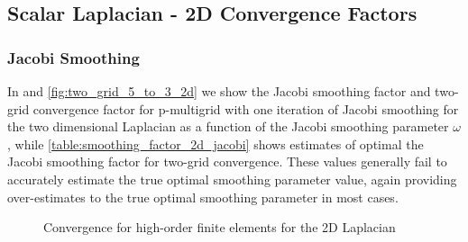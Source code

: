 \documentclass[review]{siamart190516}
\begin{document}
\subsection{Scalar Laplacian - 2D Convergence Factors}\label{sec:2dresults}

\subsubsection{Jacobi Smoothing}

In  and \cref{fig:two_grid_5_to_3_2d} we show the Jacobi smoothing factor and two-grid convergence factor for p-multigrid with one iteration of Jacobi smoothing for the two dimensional Laplacian as a function of the Jacobi smoothing parameter $\omega$, while \cref{table:smoothing_factor_2d_jacobi} shows estimates of optimal the Jacobi smoothing factor for two-grid convergence.
These values generally fail to accurately estimate the true optimal smoothing parameter value, again providing over-estimates to the true optimal smoothing parameter in most cases.

\begin{figure}[!tbp]
  \centering
  \hfill
  \caption{Convergence for high-order finite elements for the 2D Laplacian}
\end{figure}
\end{document}

